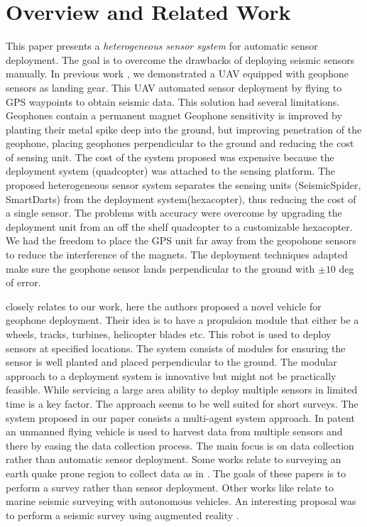\section{Overview and Related Work}\label{sec:RelatedWork}

This paper presents a \emph{heterogeneous sensor system} for automatic sensor deployment. The goal is to overcome the drawbacks of deploying seismic sensors manually. 
In previous work \cite{sudarshan2015using}, we demonstrated a UAV equipped with geophone sensors as landing gear.
This UAV automated sensor deployment by flying to GPS waypoints to obtain seismic data. 
This solution had several limitations.
Geophones contain a permanent magnet 
Geophone sensitivity is improved by planting their metal spike deep into the ground, but improving penetration of the geophone, placing geophones perpendicular to the ground and reducing the cost of sensing unit. 
The cost of the system proposed was expensive because the deployment system (quadcopter) was attached to the sensing platform.
The proposed heterogeneous sensor system separates the sensing units (SeismicSpider, SmartDarts) from the deployment system(hexacopter), thus reducing the cost of a single sensor. The problems with accuracy were overcome by upgrading the deployment unit from an off the shelf quadcopter to a customizable hexacopter. We had the freedom to place the GPS unit far away from the geopohone sensors to reduce the interference of the magnets. The deployment techniques adapted make sure the geophone sensor lands perpendicular to the ground with $\pm 10$ deg of error.

 \cite{postel2014drone} closely relates to our work, here the authors proposed a novel vehicle for geophone deployment. Their idea is to have a propulsion module that either be a wheels, tracks, turbines, helicopter blades etc. 
 This robot is used to deploy sensors at specified locations. 
 The system consists of modules for ensuring the sensor is well planted and placed perpendicular to the ground. The modular approach to a deployment system is innovative but might not be practically feasible. While servicing a large area ability to deploy multiple sensors in limited time is a key factor. The approach seems to be well suited for short surveys. The system proposed in our paper consists a multi-agent system approach.
In patent \cite{wilcox2013seismic} an unmanned flying vehicle is used to harvest data from multiple sensors and there by easing the data collection process. The main focus is on data collection rather than automatic sensor deployment.
Some works relate to surveying an earth quake prone region to collect data as in \cite{dominici2012micro}. The goals of these papers is to perform a survey rather than sensor deployment.
Other works like \cite{muyzert2015marine} relate to marine seismic surveying with autonomous vehicles. An interesting proposal was to perform a seismic survey using augmented reality \cite{jones2016seismic}.

